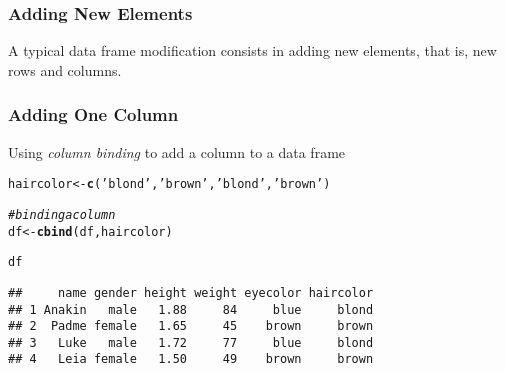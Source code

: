 \documentclass[12pt]{beamer}\usepackage[]{graphicx}\usepackage[]{color}
\makeatletter
\newcommand{\hlstr}[1]{\textcolor[rgb]{0.192,0.494,0.8}{#1}}%
\newcommand{\hlcom}[1]{\textcolor[rgb]{0.678,0.584,0.686}{\textit{#1}}}%
\newcommand{\hlopt}[1]{\textcolor[rgb]{0,0,0}{#1}}%
\newcommand{\hlstd}[1]{\textcolor[rgb]{0.345,0.345,0.345}{#1}}%
\newcommand{\hlkwb}[1]{\textcolor[rgb]{0.69,0.353,0.396}{#1}}%
\newcommand{\hlkwd}[1]{\textcolor[rgb]{0.737,0.353,0.396}{\textbf{#1}}}%
\newenvironment{kframe}{%
 \def\at@end@of@kframe{}%
 \ifinner\ifhmode%
  \def\at@end@of@kframe{\end{minipage}}%
  \begin{minipage}{\columnwidth}%
 \fi\fi%
 \def\FrameCommand##1{\hskip\@totalleftmargin \hskip-\fboxsep
 \colorbox{shadecolor}{##1}\hskip-\fboxsep
     \hskip-\linewidth \hskip-\@totalleftmargin \hskip\columnwidth}%
 \MakeFramed {\advance\hsize-\width
   \@totalleftmargin\z@ \linewidth\hsize
   \@setminipage}}%
 {\par\unskip\endMakeFramed%
 \at@end@of@kframe}
\newenvironment{knitrout}{}{} %
\makeatother
\begin{document}

\begin{frame}
\frametitle{Adding New Elements}

A typical data frame modification consists in adding new elements, that is, new rows and columns.

\end{frame}




\begin{frame}[fragile]
\frametitle{Adding One Column}

Using \textit{column binding}  to add a column to a data frame 
\begin{knitrout}\footnotesize
{}\color{fgcolor}\begin{kframe}
\begin{alltt}
\hlstd{haircolor} \hlkwb{<-} \hlkwd{c}\hlstd{(}\hlstr{'blond'}\hlstd{,} \hlstr{'brown'}\hlstd{,} \hlstr{'blond'}\hlstd{,} \hlstr{'brown'}\hlstd{)}

\hlcom{# binding a column}
\hlstd{df} \hlkwb{<-} \hlkwd{cbind}\hlstd{(df, haircolor)}

\hlstd{df}
\end{alltt}
\begin{verbatim}
##     name gender height weight eyecolor haircolor
## 1 Anakin   male   1.88     84     blue     blond
## 2  Padme female   1.65     45    brown     brown
## 3   Luke   male   1.72     77     blue     blond
## 4   Leia female   1.50     49    brown     brown
\end{verbatim}
\end{kframe}
\end{knitrout}

\end{frame}
\end{document}
